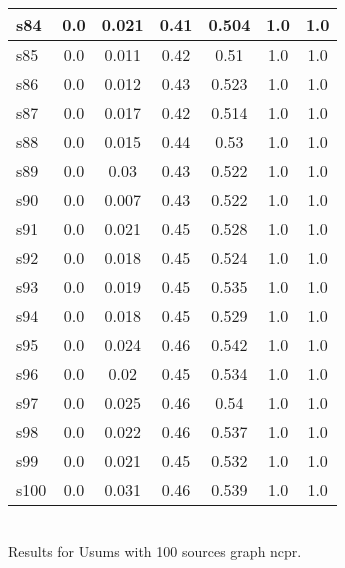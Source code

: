 \documentclass{article}
\begin{document}
\begin{tabular}{|l|c|c|c|c|c|c|}
\hline
s84 &0.0 & 0.021 & 0.41 & 0.504 & 1.0 & 1.0\\
\hline
s85 &0.0 & 0.011 & 0.42 & 0.51 & 1.0 & 1.0\\
\hline
s86 &0.0 & 0.012 & 0.43 & 0.523 & 1.0 & 1.0\\
\hline
s87 &0.0 & 0.017 & 0.42 & 0.514 & 1.0 & 1.0\\
\hline
s88 &0.0 & 0.015 & 0.44 & 0.53 & 1.0 & 1.0\\
\hline
s89 &0.0 & 0.03 & 0.43 & 0.522 & 1.0 & 1.0\\
\hline
s90 &0.0 & 0.007 & 0.43 & 0.522 & 1.0 & 1.0\\
\hline
s91 &0.0 & 0.021 & 0.45 & 0.528 & 1.0 & 1.0\\
\hline
s92 &0.0 & 0.018 & 0.45 & 0.524 & 1.0 & 1.0\\
\hline
s93 &0.0 & 0.019 & 0.45 & 0.535 & 1.0 & 1.0\\
\hline
s94 &0.0 & 0.018 & 0.45 & 0.529 & 1.0 & 1.0\\
\hline
s95 &0.0 & 0.024 & 0.46 & 0.542 & 1.0 & 1.0\\
\hline
s96 &0.0 & 0.02 & 0.45 & 0.534 & 1.0 & 1.0\\
\hline
s97 &0.0 & 0.025 & 0.46 & 0.54 & 1.0 & 1.0\\
\hline
s98 &0.0 & 0.022 & 0.46 & 0.537 & 1.0 & 1.0\\
\hline
s99 &0.0 & 0.021 & 0.45 & 0.532 & 1.0 & 1.0\\
\hline
s100 &0.0 & 0.031 & 0.46 & 0.539 & 1.0 & 1.0\\
\hline
\end{tabular}\\

\noindent Results for Usums with 100 sources graph ncpr.
\end{document}
